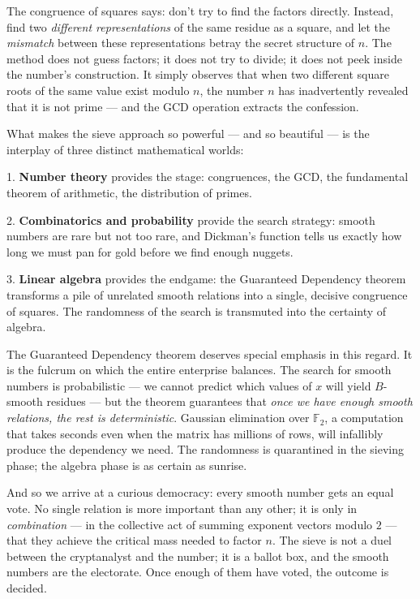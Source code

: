 The congruence of squares says: don't try to find the factors directly. Instead, find two \textit{different representations} of the same residue as a square, and let the \textit{mismatch} between these representations betray the secret structure of $n$. The method does not guess factors; it does not try to divide; it does not peek inside the number's construction. It simply observes that when two different square roots of the same value exist modulo $n$, the number $n$ has inadvertently revealed that it is not prime --- and the GCD operation extracts the confession.

What makes the sieve approach so powerful --- and so beautiful --- is the interplay of three distinct mathematical worlds:

1. \textbf{Number theory} provides the stage: congruences, the GCD, the fundamental theorem of arithmetic, the distribution of primes.

2. \textbf{Combinatorics and probability} provide the search strategy: smooth numbers are rare but not too rare, and Dickman's function tells us exactly how long we must pan for gold before we find enough nuggets.

3. \textbf{Linear algebra} provides the endgame: the Guaranteed Dependency theorem transforms a pile of unrelated smooth relations into a single, decisive congruence of squares. The randomness of the search is transmuted into the certainty of algebra.

The Guaranteed Dependency theorem deserves special emphasis in this regard. It is the fulcrum on which the entire enterprise balances. The search for smooth numbers is probabilistic --- we cannot predict which values of $x$ will yield $B$-smooth residues --- but the theorem guarantees that \textit{once we have enough smooth relations, the rest is deterministic}. Gaussian elimination over $\mathbb{F}_2$, a computation that takes seconds even when the matrix has millions of rows, will infallibly produce the dependency we need. The randomness is quarantined in the sieving phase; the algebra phase is as certain as sunrise.

And so we arrive at a curious democracy: every smooth number gets an equal vote. No single relation is more important than any other; it is only in \textit{combination} --- in the collective act of summing exponent vectors modulo $2$ --- that they achieve the critical mass needed to factor $n$. The sieve is not a duel between the cryptanalyst and the number; it is a ballot box, and the smooth numbers are the electorate. Once enough of them have voted, the outcome is decided.


